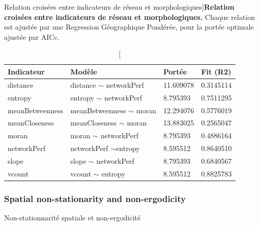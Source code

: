 

\begin{table}
\caption[][Relation croisées entre indicateurs de réseau et morphologiques]{}{\textbf{Relation croisées entre indicateurs de réseau et morphologiques.} Chaque relation est ajustée par une Regression Géographique Pondérée, pour la portée optimale ajustée par AICc.\label{tab:staticcorrelations:gwr}}
\begin{tabular}{|l|l|l|l|}
\hline
Indicateur & Modèle & Portée & Fit (R2) \\ \hline
distance & distance $\sim$ networkPerf & 11.609078 & 0.3145114 \\
entropy  & entropy $\sim$ networkPerf &  8.795393  &0.7511295 \\
meanBetweenness & meanBetweenness $\sim$ moran & 12.294076 & 0.5776019 \\
meanCloseness &  meanCloseness $\sim$ moran & 13.883025 & 0.2565047 \\
moran & moran $\sim$ networkPerf &  8.795393 & 0.4886164 \\
networkPerf & networkPerf $\sim$entropy & 8.595512  & 0.8640510 \\
slope & slope $\sim$ networkPerf & 8.795393  & 0.6840567 \\
vcount & vcount $\sim$ entropy & 8.595512  & 0.8825783 \\\hline
\end{tabular}
\end{table}



\subsubsection{Spatial non-stationarity and non-ergodicity}{Non-stationnarité spatiale et non-ergodicité}


